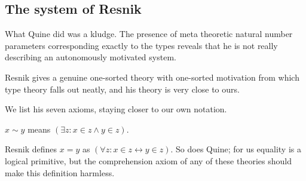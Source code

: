 \documentclass[12pt]{article}
\renewcommand{\smallpara}[1]{\begin{footnotesize}\begin{spacing}{0.8}\begin{quote} #1  \end{quote}\end{spacing}\end{footnotesize}}
\begin{document}
\subsection{The system of Resnik}\label{resnik}

What Quine did was a kludge.  The presence of meta theoretic natural number parameters corresponding exactly to the types
reveals that he is not really describing an autonomously motivated system.%

Resnik gives a genuine one-sorted theory with one-sorted motivation from which type theory falls out neatly,  and his theory is very close to ours.

We list his seven axioms, staying closer to our own notation.



\begin{dfn} $x \sim y$ means $(\exists z:x \in z \wedge y \in z)$.\end{dfn}
Resnik defines $x=y$ as $(\forall z:x \in z \leftrightarrow y \in z)$.
So does Quine; for us equality is a logical primitive, but the
comprehension axiom of any of these theories should make this
definition harmless.
\end{document}
